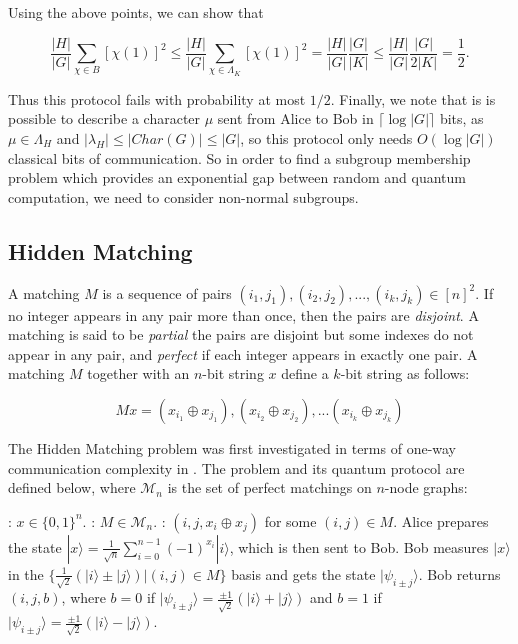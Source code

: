 \documentclass[a4paper]{article}
\begin{document}
        Using the above points, we can show that

        $$\frac{|H|}{|G|}\sum_{\chi \in B}[\chi(1)]^2 \leq \frac{|H|}{|G|}\sum_{\chi \in \Lambda_K}[\chi(1)]^2 = \frac{|H|}{|G|}\frac{|G|}{|K|} \leq \frac{|H|}{|G|}\frac{|G|}{2|K|} = \frac{1}{2}.$$

        Thus this protocol fails with probability at most $1/2$. Finally, we note that is is possible to describe a character $\mu$ sent from Alice to Bob in $\lceil\log|G|\rceil$ bits, as $\mu \in \Lambda_H$ and $|\lambda_H| \leq |Char(G)| \leq |G|$, so this protocol only needs $O(\log |G|)$ classical bits of communication. So in order to find a subgroup membership problem which provides an exponential gap between random and quantum computation, we need to consider non-normal subgroups.

        \subsection{Hidden Matching}
        \label{sec:hidden-matching}

        A matching $M$ is a sequence of pairs $(i_1, j_1), (i_2, j_2),...,(i_k, j_k) \in [n]^2$. If no integer appears in any pair more than once, then the pairs are {\em disjoint}. A matching is said to be {\em partial} the pairs are disjoint but some indexes do not appear in any pair, and {\em perfect} if each integer appears in exactly one pair. A matching $M$ together with an $n$-bit string $x$ define a $k$-bit string as follows:

        $$Mx = (x_{i_1} \oplus x_{j_1}), (x_{i_2} \oplus x_{j_2}), ... (x_{i_k} \oplus x_{j_k})$$

        The Hidden Matching problem was first investigated in terms of one-way communication complexity in \cite{doi:10.1137/060651835}. The problem and its quantum protocol are defined below, where $\mathcal{M}_n$ is the set of perfect matchings on $n$-node graphs:

        \begin{codebox}
            \zi {}: $x \in \{0,1\}^n$.
            \zi {}: $M \in \mathcal{M}_n$.
            \zi {}: $(i, j, x_i\oplus x_j)$ for some $(i, j) \in M$.
            \li Alice prepares the state $|x\rangle = \frac{1}{\sqrt{n}}\sum_{i = 0}^{n - 1}(-1)^{x_i}|i\rangle$, which is then sent to Bob.
            \li Bob measures $|x\rangle$ in the $\{\frac{1}{\sqrt{2}}(|i\rangle\pm|j\rangle)|(i, j) \in M\}$ basis and gets the state $|\psi_{i\pm j}\rangle$.
            \li Bob returns $(i, j, b)$, where $b = 0$ if $|\psi_{i\pm j}\rangle = \frac{\pm 1}{\sqrt{2}}(|i\rangle+|j\rangle)$ and $b = 1$ if $|\psi_{i\pm j}\rangle = \frac{\pm 1}{\sqrt{2}}(|i\rangle-|j\rangle)$.
        \end{codebox}
\end{document}
